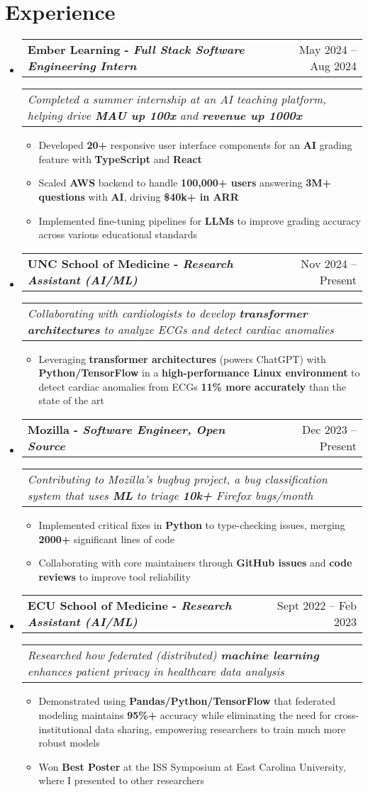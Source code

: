 \documentclass[letterpaper,11pt]{article}
\makeatletter
\newcommand{\resumeItem}[1]{
  \item\small{
    {#1 \vspace{-2pt}}}
}
\newcommand{\resumeSubheading}[3]{
  \vspace{-2pt}\item
    \begin{tabular*}{0.97\textwidth}[t]{l@{\extracolsep{\fill}}r}
      \textbf{#1} & #2 \\
    \end{tabular*}
    \begin{tabular*}{0.97\textwidth}[t]{l}
      \textit{\small#3} \\
    \end{tabular*}\vspace{-7pt}
}
\newcommand{\resumeSubHeadingListStart}{\begin{itemize}[leftmargin=0.15in, label={}]}
\newcommand{\resumeSubHeadingListEnd}{\end{itemize}}
\newcommand{\resumeItemListStart}{\begin{itemize}}
\newcommand{\resumeItemListEnd}{\end{itemize}\vspace{-5pt}}
\makeatother
\begin{document}
\section{Experience}
  \resumeSubHeadingListStart
    \resumeSubheading
      {\textbf{Ember Learning} - \textit{Full Stack Software Engineering Intern}}{May 2024 -- Aug 2024}
      {Completed a summer internship at an AI teaching platform, helping drive \textbf{MAU up 100x} and \textbf{revenue up 1000x}}
      \resumeItemListStart
        \resumeItem{Developed \textbf{20+} responsive user interface components for an \textbf{AI} grading feature with \textbf{TypeScript} and \textbf{React}}
        \resumeItem{Scaled \textbf{AWS} backend to handle \textbf{100,000+ users} answering \textbf{3M+ questions} with \textbf{AI}, driving \textbf{\$40k+ in ARR}}
        \resumeItem{Implemented fine-tuning pipelines for \textbf{LLMs} to improve grading accuracy across various educational standards}
      \resumeItemListEnd
      \resumeSubheading
      {\textbf{UNC School of Medicine} - \textit{Research Assistant (AI/ML)}}{ Nov 2024 -- Present}
      {Collaborating with cardiologists to develop \textbf{transformer architectures} to analyze ECGs and detect cardiac anomalies}
      \resumeItemListStart
        \resumeItem{Leveraging \textbf{transformer architectures} (powers ChatGPT) with \textbf{Python/TensorFlow} in a \textbf{high-performance Linux environment} to detect cardiac anomalies from ECGs \textbf{11\% more accurately} than the state of the art}
      \resumeItemListEnd
      \resumeSubheading
      {\textbf{Mozilla} - \textit{Software Engineer, Open Source}}{Dec 2023 -- Present}
      {Contributing to Mozilla's bugbug project, a bug classification system that uses \textbf{ML} to triage \textbf{10k+} Firefox bugs/month} 
      \resumeItemListStart
        \resumeItem{Implemented critical fixes in \textbf{Python} to type-checking issues, merging \textbf{2000+} significant lines of code}
        \resumeItem{Collaborating with core maintainers through \textbf{GitHub issues} and \textbf{code reviews} to improve tool reliability}
      \resumeItemListEnd
      \resumeSubheading
      {\textbf{ECU School of Medicine} - \textit{Research Assistant (AI/ML)}}{Sept 2022 -- Feb 2023}
      {Researched how federated (distributed) \textbf{machine learning} enhances patient privacy in healthcare data analysis}
      \resumeItemListStart
        \resumeItem{Demonstrated using \textbf{Pandas/Python/TensorFlow} that federated modeling maintains \textbf{95\%+} accuracy while eliminating the need for cross-institutional data sharing, empowering researchers to train much more robust models}
        \resumeItem{Won \textbf{Best Poster} at the ISS Symposium at East Carolina University, where I presented to other researchers}
      \resumeItemListEnd
  \resumeSubHeadingListEnd
\end{document}
